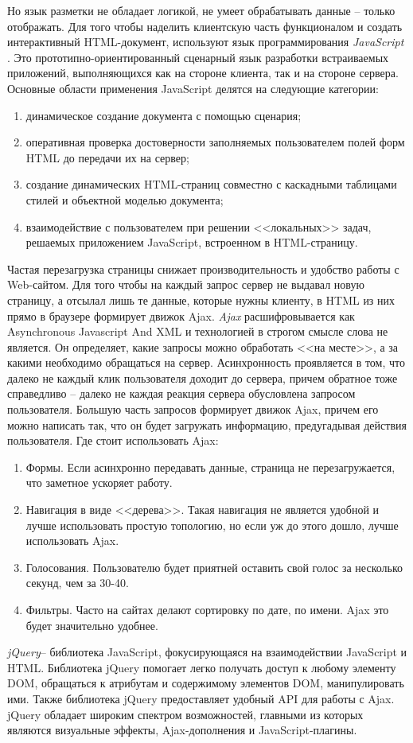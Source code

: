 Но язык разметки не обладает логикой, не умеет обрабатывать данные -- только отображать. Для того чтобы наделить клиентскую часть функционалом и создать интерактивный HTML-документ, используют язык программирования {\itshape JavaScript }. Это прототипно-ориентированный сценарный язык разработки встраиваемых приложений, выполняющихся как на стороне клиента, так и на стороне сервера\cite{php}.
Основные области применения JavaScript делятся на следующие категории:
\begin{enumerate}
\item динамическое создание документа с помощью сценария;
\item оперативная проверка достоверности заполняемых пользователем полей форм HTML до передачи их на сервер;
\item создание динамических HTML-страниц совместно с каскадными таблицами стилей и объектной моделью документа;
\item взаимодействие с пользователем при решении <<локальных>> задач, решаемых приложением JavaScript, встроенном в HTML-страницу.
\end{enumerate}

Частая перезагрузка страницы снижает производительность и удобство работы с Web-сайтом. Для того чтобы на каждый запрос сервер не выдавал новую страницу, а отсылал лишь те данные, которые нужны клиенту, в HTML из них прямо в браузере формирует движок Ajax.
{\itshape Ajax } расшифровывается как Asynchronous Javascript And XML и технологией в строгом смысле слова не является. Он определяет, какие запросы можно обработать <<на месте>>, а за какими необходимо обращаться на сервер. Асинхронность проявляется в том, что далеко не каждый клик пользователя доходит до сервера, причем обратное тоже справедливо -- далеко не каждая реакция сервера обусловлена запросом пользователя. Большую часть запросов формирует движок Ajax, причем его можно написать так, что он будет загружать информацию, предугадывая действия пользователя\cite{php}.
Где стоит использовать Ajax:
\begin{enumerate}
\item Формы. Если асинхронно передавать данные, страница не перезагружается, что заметное ускоряет работу.
\item Навигация в виде <<дерева>>. Такая навигация не является удобной и лучше использовать простую топологию, но если уж до этого дошло, лучше использовать Ajax.
\item Голосования. Пользователю будет приятней оставить свой голос за несколько секунд, чем за 30-40.
\item Фильтры. Часто на сайтах делают сортировку по дате, по имени. Ajax это будет значительно удобнее.
\end{enumerate}

 
{\itshape jQuery}-- библиотека JavaScript, фокусирующаяся на взаимодействии JavaScript и HTML. Библиотека jQuery помогает легко получать доступ к любому элементу DOM, обращаться к атрибутам и содержимому элементов DOM, манипулировать ими. Также библиотека jQuery предоставляет удобный API для работы с Ajax. jQuery обладает широким спектром возможностей, главными из которых являются визуальные эффекты, Ajax-дополнения и JavaScript-плагины\cite{php}.


\clearpage